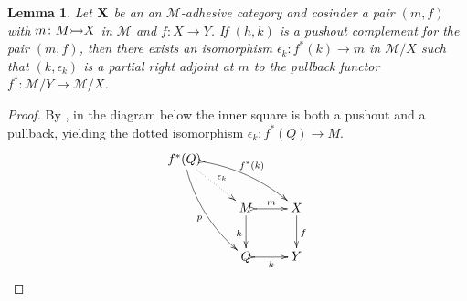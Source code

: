 \documentclass[a4paper]{article}
\newcommand{\mto}[0]{\scalebox{1}{$\rightarrowtail$}}
\def\X{\textbf {\textup{X}}}
\newtheorem{lemma}[theorem]{Lemma}
\theoremstyle{definition}
\begin{document}
\begin{lemma}\label{lem:part}
	Let $\X$ be an  an $\mathcal{M}$-adhesive category  and cosinder a pair $(m,f)$ with $m\colon M\mto X $ in $\mathcal{M}$ and $f:X\to Y$. If $(h, k)$ is a pushout complement for the pair $(m,f)$, then there exists an isomorphism $\epsilon_k:f^*(k)\to m$ in $\mathcal{M}/X$ such that $(k, \epsilon_k)$ is  a partial right adjoint at $m$ to the pullback functor $f^*\colon \mathcal{M}/Y\to \mathcal{M}/X$.
\end{lemma}
\begin{proof}
	By , in the diagram below the inner square is both  a pushout and a pullback, yielding the dotted isomorphism $\epsilon_k\colon f^*(Q)\to M$.
\[\xymatrix{f^*(Q) \ar@{.>}[dr]^{\epsilon_k} \ar@{>->}@/^.3cm/[drr]^{f^*(k)} \ar@/_.3cm/[ddr]_{p}\\& M \ar@{>->}[r]^{m}\ar[d]_{h}& X \ar[d]^f \\&Q\ar@{>->}[r]_{k}&Y}\]


\end{proof}
\end{document}
